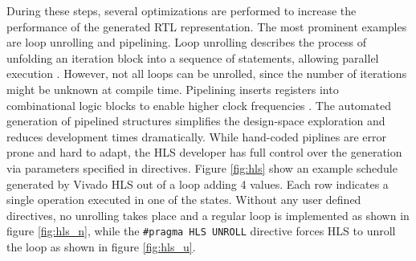 During these steps, several optimizations are performed to increase the
performance of the generated \ac{RTL} representation. The most prominent
examples are loop unrolling and pipelining. Loop unrolling describes the
process of unfolding an iteration block into a sequence of statements,
allowing parallel execution \citep{SWL13}. However, not all loops can be
unrolled, since the number of iterations might be unknown at compile time.
Pipelining inserts registers into combinational logic blocks to enable higher
clock frequencies \citep{SWL13}. The automated generation of pipelined
structures simplifies the design-space exploration and reduces development
times dramatically. While hand-coded piplines are error prone and hard to
adapt, the \ac{HLS} developer has full control over the generation via
parameters specified in directives. Figure \ref{fig:hls} show an example
schedule generated by Vivado HLS out of a loop adding 4 values. Each row
indicates a single operation executed in one of the states. Without any user
defined directives, no unrolling takes place and a regular loop is implemented
as shown in figure \ref{fig:hls_n}, while the \lstinline{#pragma HLS UNROLL}
directive forces \ac{HLS} to unroll the loop as shown in figure
\ref{fig:hls_u}.
%
%
%
